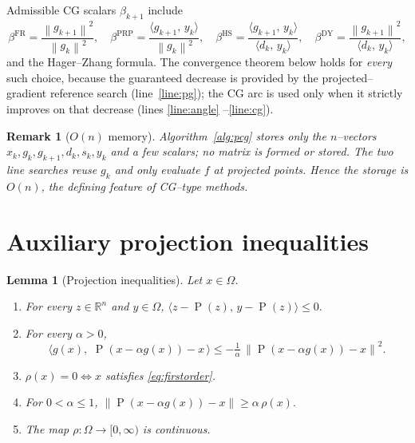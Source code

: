 \documentclass[12pt]{article}
\newtheorem{lemma}{Lemma}
\newtheorem{remark}{Remark}
\DeclareMathOperator{\proj}{P}
\newcommand{\R}{\mathbb{R}}
\newcommand{\norm}[1]{\left\lVert #1 \right\rVert}
\newcommand{\inner}[2]{\langle #1,\, #2\rangle}
\begin{document}
Admissible CG scalars $\beta_{k+1}$ include
\[
\beta^{\mathrm{FR}}=\frac{\norm{g_{k+1}}^2}{\norm{g_k}^2},\quad
\beta^{\mathrm{PRP}}=\frac{\inner{g_{k+1}}{y_k}}{\norm{g_k}^2},\quad
\beta^{\mathrm{HS}}=\frac{\inner{g_{k+1}}{y_k}}{\inner{d_k}{y_k}},\quad
\beta^{\mathrm{DY}}=\frac{\norm{g_{k+1}}^2}{\inner{d_k}{y_k}},
\]
and the Hager--Zhang formula. The convergence theorem below holds for
\emph{every} such choice, because the guaranteed decrease is provided by the
projected--gradient reference search (line~\ref{line:pg}); the CG arc is used
only when it strictly improves on that decrease (lines \ref{line:angle}%
--\ref{line:cg}).

\begin{remark}[$O(n)$ memory]\label{rem:mem}
Algorithm~\ref{alg:pcg} stores only the $n$--vectors
$x_k,g_k,g_{k+1},d_k,s_k,y_k$ and a few scalars; no matrix is formed or stored.
The two line searches reuse $g_k$ and only evaluate $f$ at projected points.
Hence the storage is $O(n)$, the defining feature of CG--type methods.
\end{remark}

\section{Auxiliary projection inequalities}

\begin{lemma}[Projection inequalities]\label{lem:proj}
Let $x\in\Omega$.
\begin{enumerate}
\item[(i)] For every $z\in\R^n$ and $y\in\Omega$,
$\inner{z-\proj(z)}{y-\proj(z)}\le0.$
\item[(ii)] For every $\alpha>0$,
\begin{equation}\label{eq:keydescent}
\inner{g(x)}{\,\proj(x-\alpha g(x))-x\,}\le
-\tfrac{1}{\alpha}\,\norm{\proj(x-\alpha g(x))-x}^2 .
\end{equation}
\item[(iii)] $\rho(x)=0\iff x$ satisfies \eqref{eq:firstorder}.
\item[(iv)] For $0<\alpha\le1$,
$\norm{\proj(x-\alpha g(x))-x}\ge\alpha\,\rho(x).$
\item[(v)] The map $\rho:\Omega\to[0,\infty)$ is continuous.
\end{enumerate}
\end{lemma}
\end{document}
